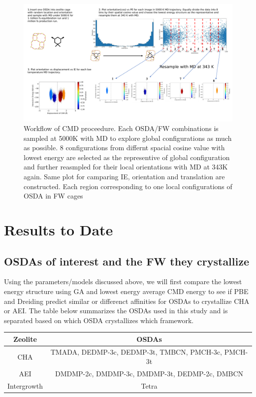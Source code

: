\documentclass[journal=accacs,manuscript=article, email=true, layout=traditional]{achemso}
\begin{document}
\begin{enumerate}
\begin{figure}
\begin{center}

\includegraphics[scale=.5]{./Figures/CMD-OSDA-FW-Workflow.pdf}
\caption{Workflow of CMD proceedure. Each OSDA/FW combinations is sampled at 5000K with MD to explore global configurations as much as possible. 8 configurations from differnt spacial cosine value with lowest energy are selected as the representive of global configuration and further reasmpled for their local orientations with MD at 343K again. Same plot for camparing IE, orientation and translation are constructed. Each region corresponding to one local configurations of OSDA in FW cages}
\label{fig:CMD-OSDA-FW-Workflow}

\end{center}
\end{figure}
\end{enumerate}

\section{Results to Date}
\label{sec:orgf90ca58}
\subsection{OSDAs of interest and the FW they crystallize}
\label{sec:orgd7a02d0}
Using the parameters/models discussed above, we will first compare the lowest energy structure using GA and lowest energy average CMD energy to see if PBE and Dreiding predict similar or differenct affinities for OSDAs to crystallize CHA or AEI. The table below summarizes the OSDAs used in this study and is separated based on which OSDA crystallizes which framework. 

\begin{center}
\begin{tabular}{c|c}
\hline
Zeolite & OSDAs \\
\hline
CHA          & TMADA, DEDMP-3c, DEDMP-3t, TMBCN, PMCH-3c, PMCH-3t \\
AEI          & DMDMP-2c, DMDMP-3c, DMDMP-3t, DEDMP-2c, DMBCN \\
Intergrowth  & Tetra \\
\hline
\end{tabular}
\end{center}
\end{document}
